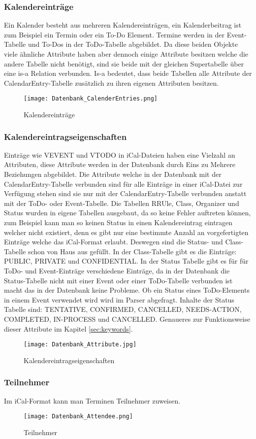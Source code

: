 \subsubsection*{Kalendereinträge}
\label{ref:kalenderEintraege}
Ein Kalender besteht aus mehreren Kalendereinträgen, ein Kalenderbeitrag ist zum Beispiel ein Termin oder ein To-Do Element. Termine werden in der Event-Tabelle und To-Dos in der ToDo-Tabelle abgebildet. Da diese beiden Objekte viele ähnliche Attribute haben aber dennoch einige Attribute besitzen welche die andere Tabelle nicht benötigt, sind sie beide mit der gleichen Supertabelle über eine is-a Relation verbunden. Is-a bedeutet, dass beide Tabellen alle Attribute der CalendarEntry-Tabelle zusätzlich zu ihren eigenen Attributen besitzen.
\begin{figure}[H]
	\texttt{[image: Datenbank\_CalenderEntries.png]}
    \caption{Kalendereinträge}
    \label{fig:calendarEntries}
\end{figure}

\subsubsection*{Kalendereintragseigenschaften}
\label{ref:kalendereintragseigenschaften}
Einträge wie VEVENT und VTODO in iCal-Dateien haben eine Vielzahl an Attributen, diese Attribute werden in der Datenbank durch Eins zu Mehrere Beziehungen abgebildet. Die Attribute welche in der Datenbank mit der CalendarEntry-Tabelle verbunden sind für alle Einträge in einer iCal-Datei zur Verfügung stehen sind sie nur mit der CalendarEntry-Tabelle verbunden anstatt mit der ToDo- oder Event-Tabelle. Die Tabellen RRUle, Class, Organizer und Status wurden in eigene Tabellen ausgebaut, da so keine Fehler auftreten können, zum Beispiel kann man so keinen Status in einen Kalendereintrag eintragen welcher nicht existiert, denn es gibt nur eine bestimmte Anzahl an vorgefertigten Einträge welche das iCal-Format erlaubt. Deswegen sind die Status- und Class-Tabelle schon von Haus aus gefüllt.
In der Class-Tabelle gibt es die Einträge: PUBLIC, PRIVATE und CONFIDENTIAL. In der Status Tabelle gibt es für für ToDo- und Event-Einträge verschiedene Einträge, da in der Datenbank die Status-Tabelle nicht mit einer Event oder einer ToDo-Tabelle verbunden ist macht das in der Datenbank keine Probleme. Ob ein Status eines ToDo-Elements in einem Event verwendet wird wird im Parser abgefragt. Inhalte der Status Tabelle sind: TENTATIVE, CONFIRMED, CANCELLED, NEEDS-ACTION, COMPLETED, IN-PROCESS und CANCELLED. Genaueres zur Funktionsweise dieser Attribute im Kapitel \ref{sec:keywords}.
\begin{figure}[H]
	\texttt{[image: Datenbank\_Attribute.jpg]}
    \caption{Kalendereintragseigenschaften}
    \label{fig:kalendereintragseigenschaften}
\end{figure}

\subsubsection*{Teilnehmer}
\label{ref:teilnehmer}
Im iCal-Format kann man Terminen Teilnehmer zuweisen.
\begin{figure}[H]
	\texttt{[image: Datenbank\_Attendee.png]}
    \caption{Teilnehmer}
    \label{fig:datenbankTeilnehmer}
\end{figure}

